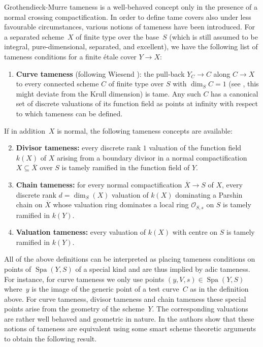 \documentclass[a4paper,twoside,11pt,reqno]{amsart}
\newcommand{\cO}{{\mathcal O}}
\DeclareMathOperator{\Spa}{Spa}
\newcommand{\ov}[1]{\overline{#1}}
\theoremstyle{definition}
\numberwithin{equation}{subsection}
\begin{document}
Grothendieck-Murre tameness is a well-behaved concept only in the presence of a normal crossing compactification.
In order to define tame covers also under less favourable circumstances, various notions of tameness have been introduced.
For a separated scheme~$X$ of finite type over the base~$S$ (which is still assumed to be integral, pure-dimensional, separated, and excellent), we have the following list of tameness conditions for a finite étale cover $Y \to X$:
\begin{enumerate}
    \item \label{def:curve tameness}
    \textbf{Curve tameness} (following Wiesend \cite{Wiesend2008:TamelyRamifiedCovers}):    
    the pull-back $Y_C \to C$ along $C \to X$ to every connected scheme $C$ of finite type over $S$ with $\dim_S C = 1$ (see \cite[Definition on p.653]{KerzSchmidt2010:DifferentNotionsTameness}, this might deviate from the Krull dimension) is tame.
    Any such $C$ has a canonical set of discrete valuations of its function field as points at infinity with respect to which tameness can be defined.
\end{enumerate}
If in addition~$X$ is normal, the following tameness concepts are available:
\begin{enumerate}
    \setcounter{enumi}{1}
    \item  \label{def:divisor tameness}
    \textbf{Divisor tameness:} every discrete rank $1$ valuation of the function field $k(X)$ of $X$ arising from a boundary divisor in a normal compactification $X \subseteq \ov X$ over $S$ is tamely ramified in the function field of $Y$.
    \item  \label{def:chain tameness}
    \textbf{Chain tameness:} for every normal compactification $\ov X \to S$ of $X$,
    every discrete rank $d = \dim_S(X)$ valuation of $k(X)$ dominating a Parshin chain on $\ov X$ whose valuation ring dominates a local ring $\cO_{S,s}$ on $S$ is tamely ramified in $k(Y)$.
    \item  \label{def:valuation tameness}
    \textbf{Valuation tameness:} every valuation of $k(X)$ with centre on $S$ is tamely ramified in $k(Y)$.   
\end{enumerate}
All of the above definitions can be interpreted as placing tameness conditions on points of $\Spa(Y,S)$ of a special kind and are thus implied by adic tameness.
For instance, for curve tameness we only use points $(y,V,s) \in \Spa(Y,S)$ where~$y$ is the image of the generic point of a test curve~$C$ as in the definition above.
For curve tameness, divisor tameness and chain tameness these special points arise from the geometry of the scheme~$Y$.
The corresponding valuations are rather well behaved and geometric in nature.
In \cite{KerzSchmidt2010:DifferentNotionsTameness} the authors show that these notions of tameness are equivalent using some smart scheme theoretic arguments to obtain the following result.
\end{document}

